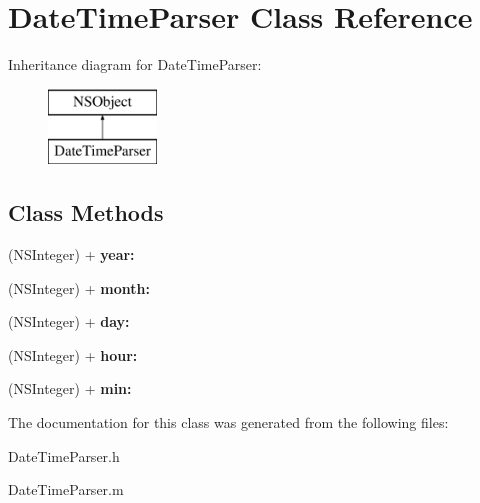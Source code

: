 \hypertarget{interface_date_time_parser}{\section{Date\+Time\+Parser Class Reference}
\label{interface_date_time_parser}
}
Inheritance diagram for Date\+Time\+Parser\+:\begin{figure}[H]
\begin{center}
\leavevmode
\includegraphics[height=2.000000cm]{interface_date_time_parser}
\end{center}
\end{figure}
\subsection*{Class Methods}
\begin{DoxyCompactItemize}
\item 
\hypertarget{interface_date_time_parser_a55231e1512eef70e1c551ca833326d75}{(N\+S\+Integer) + {\bfseries year\+:}}\label{interface_date_time_parser_a55231e1512eef70e1c551ca833326d75}

\item 
\hypertarget{interface_date_time_parser_af59822ee3b3334cd759b98a2cb9b776c}{(N\+S\+Integer) + {\bfseries month\+:}}\label{interface_date_time_parser_af59822ee3b3334cd759b98a2cb9b776c}

\item 
\hypertarget{interface_date_time_parser_abb97d88f3b90f79e7479938a381b2f04}{(N\+S\+Integer) + {\bfseries day\+:}}\label{interface_date_time_parser_abb97d88f3b90f79e7479938a381b2f04}

\item 
\hypertarget{interface_date_time_parser_af7098a270403be453d8a197baacb7c46}{(N\+S\+Integer) + {\bfseries hour\+:}}\label{interface_date_time_parser_af7098a270403be453d8a197baacb7c46}

\item 
\hypertarget{interface_date_time_parser_a62b5e9cf5b8112f93e72c8073a77a6b3}{(N\+S\+Integer) + {\bfseries min\+:}}\label{interface_date_time_parser_a62b5e9cf5b8112f93e72c8073a77a6b3}

\end{DoxyCompactItemize}


The documentation for this class was generated from the following files\+:\begin{DoxyCompactItemize}
\item 
Date\+Time\+Parser.\+h\item 
Date\+Time\+Parser.\+m\end{DoxyCompactItemize}

